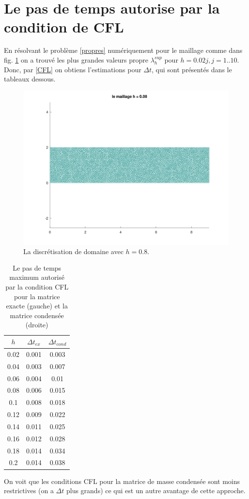 \documentclass[12pt]{article}
\begin{document}
	\section{Le pas de temps autorise par la condition de CFL}
	En résolvant le problème \eqref{propres} numériquement pour le maillage comme dans fig. \ref{fig:maillage1} on a trouvé les plus grandes valeurs propre $\lambda^{sup}_h$ pour $h = 0.02j, j = 1..10$. Donc, par \eqref{CFL} on obtiens l'estimations pour $\Delta t$, qui sont présentés dans le tableaux dessous.
	\begin{figure}[h]
		\centering
		\includegraphics[height=0.4\linewidth]{images/maillage1}
		\caption{La discrétisation de domaine  avec $h = 0.8$.}
		\label{fig:maillage1}
	\end{figure}
	\begin{table}[H]
		\caption{\label{tab:canonsummary} Le pas de temps maximum autorisé par la condition CFL pour la matrice exacte (gauche) et la matrice condensée (droite) }
		\begin{center}
			\begin{tabular}{|c|c|c|}
				\hline
				$h$ & $\Delta t_{ex}$ & $\Delta t_{cond}$ \\
				\hline
				0.02 & 0.001 &  0.003 \\ 
				0.04 & 0.003 & 0.007 \\
				0.06 & 0.004 & 0.01\\
				0.08 & 0.006 & 0.015\\
				0.1  & 0.008 & 0.018\\
				0.12 & 0.009 & 0.022\\
				0.14 & 0.011 & 0.025\\
				0.16 & 0.012 & 0.028\\
				0.18 & 0.014 & 0.034\\
				0.2  & 0.014 & 0.038\\
				\hline
			\end{tabular}
		\end{center}
	\end{table} 
	On voit que les conditions CFL pour la matrice de masse condensée sont moins restrictives (on a $\Delta t$ plus grands) ce qui est un autre avantage de cette approche.
\end{document}
